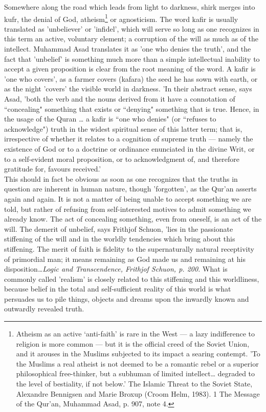 \documentclass[10pt, twoside,openright]{book}
\begin{document}
Somewhere along the road which leads from light to darkness, shirk merges into kufr, the denial of 
God, atheism\footnote{Atheism as an active `anti\hyp{}faith' is rare in the West --- a lazy indifference to religion is more common --- but it is the official creed of the Soviet Union, and it arouses in the Muslims subjected to its impact a searing contempt. 'To the Muslims a real atheist is not deemed to be a romantic rebel or 
a superior philosophical free\hyp{}thinker, but a subhuman of limited intellect\ldots{} degraded to the level 
of bestiality, if not below.' The Islamic Threat to the Soviet State, Alexandre Bennigsen and Marie 
Broxup (Croom Helm, 1983). 1 The Message of the Qur'an, Muhammad Asad, p. 907, note 4.} or agnosticism. The word kafir is usually translated as 'unbeliever' or 'infidel', which will serve so long as one recognizes in this term an active, voluntary element; a corruption of the will as much as of the intellect. Muhammad Asad translates it as 'one who denies the truth', and the fact that 'unbelief' is something much more than a simple intellectual inability to accept a given proposition is clear from the root meaning of the word. A kafir is 'one who covers', as a farmer covers (kafara) the seed he has sown with earth, or as the night 'covers' the visible world in darkness. 'In their abstract sense, says Asad, 'both the verb and the nouns derived from it have a connotation of ``concealing" something that exists or ``denying" something that is true. Hence, in the usage of the Quran \ldots{} a kafir is ``one who denies" (or ``refuses to acknowledge") truth in the widest spiritual sense of this latter term; that is, irrespective of whether it relates to a cognition of supreme truth --- namely the existence of God or to a doctrine or ordinance enunciated in the divine Writ, or to a self\hyp{}evident moral proposition, or to acknowledgment of, and therefore gratitude for, favours received.'\\

This should in fact be obvious as soon as one recognizes that the truths in question are inherent in 
human nature, though 'forgotten', as the Qur'an asserts again and again. It is not a matter of being 
unable to accept something we are told, but rather of refusing from self-interested motives to admit 
something we already know. The act of concealing something, even from oneself, is an act of the will. 
The demerit of unbelief, says Frithjof Schuon, 'lies in the passionate stiffening of the will and in 
the worldly tendencies which bring about this stiffening. The merit of faith is fidelity to the 
supernaturally natural receptivity of primordial man; it means remaining as God made us and remaining 
at his disposition\ldots{}\emph{Logic and Transcendence, Frithjof Schuon, p. 200.} What is commonly called 'realism' is closely related to this stiffening and this worldliness, because belief in the total and self\hyp{}sufficient reality of this world is what persuades us to pile things, objects and dreams upon the inwardly known and outwardly revealed truth. \\
\end{document}

